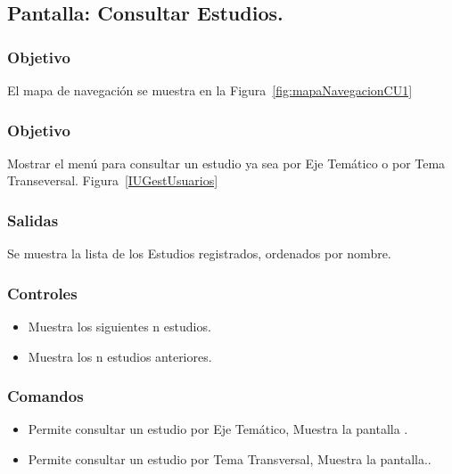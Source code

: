 \subsection{Pantalla: Consultar Estudios.}

\subsubsection{Objetivo}
	El mapa de navegación se muestra en la Figura~\ref{fig:mapaNavegacionCU1}


\subsubsection{Objetivo}
Mostrar el menú para consultar un estudio ya sea por Eje Temático o por Tema Transeversal.
Figura~\ref{IUGestUsuarios}

\subsubsection{Salidas}
Se muestra la lista de los Estudios registrados, ordenados por nombre.
\subsubsection{Controles}
\begin{itemize}
 \item {} Muestra los siguientes n estudios.
 \item {} Muestra los n estudios anteriores.
\end{itemize}

\subsubsection{Comandos}
\begin{itemize}
 \item {} Permite consultar un estudio por Eje Temático, Muestra la pantalla .
 \item {} Permite consultar un estudio por Tema Transversal, Muestra la pantalla..

\end{itemize}


